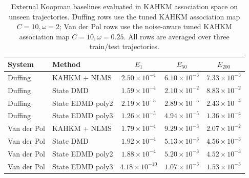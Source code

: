 \begin{table}[t]
\centering
\small
\caption{External Koopman baselines evaluated in KAHKM association space on unseen trajectories. Duffing rows use the tuned KAHKM association map $C=10,\omega=2$; Van der Pol rows use the noise-aware tuned KAHKM association map $C=10,\omega=0.25$. All rows are averaged over three train/test trajectories.}
\label{tab:external_baselines}
\begin{tabular}{llccc}
\toprule
System & Method & $E_1$ & $E_{50}$ & $E_{200}$ \\
\midrule
Duffing & KAHKM + NLMS & $2.50\times10^{-4}$ & $6.10\times10^{-3}$ & $7.33\times10^{-3}$ \\
Duffing & State DMD & $1.59\times10^{-4}$ & $2.10\times10^{-2}$ & $8.83\times10^{-2}$ \\
Duffing & State EDMD poly2 & $2.19\times10^{-5}$ & $2.89\times10^{-5}$ & $2.43\times10^{-4}$ \\
Duffing & State EDMD poly3 & $1.26\times10^{-5}$ & $4.94\times10^{-5}$ & $1.36\times10^{-4}$ \\
\midrule
Van der Pol & KAHKM + NLMS & $1.79\times10^{-4}$ & $9.29\times10^{-3}$ & $2.07\times10^{-2}$ \\
Van der Pol & State DMD & $1.92\times10^{-4}$ & $5.13\times10^{-3}$ & $4.56\times10^{-3}$ \\
Van der Pol & State EDMD poly2 & $1.88\times10^{-4}$ & $5.20\times10^{-3}$ & $4.52\times10^{-3}$ \\
Van der Pol & State EDMD poly3 & $4.18\times10^{-10}$ & $1.07\times10^{-3}$ & $1.53\times10^{-3}$ \\
\bottomrule
\end{tabular}
\end{table}

